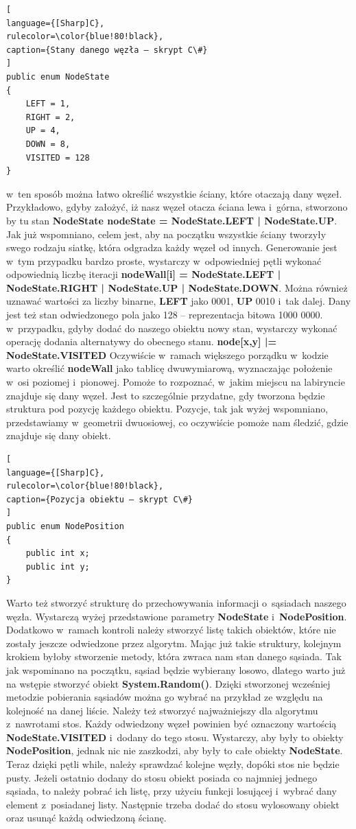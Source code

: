 \documentclass[oneside,polski,logo]{amuthesis}
\begin{document}
\begin{lstlisting}[
language={[Sharp]C},
rulecolor=\color{blue!80!black},
caption={Stany danego węzła – skrypt C\#}
]
public enum NodeState
{
    LEFT = 1,
    RIGHT = 2,
    UP = 4,
    DOWN = 8,
    VISITED = 128
}
\end{lstlisting}
w~ten sposób można łatwo określić wszystkie ściany, które otaczają dany węzeł. Przykładowo, gdyby założyć, iż nasz węzeł otacza ściana lewa i~górna, stworzono by tu stan \textbf{NodeState nodeState = NodeState.LEFT | NodeState.UP}. Jak już wspomniano, celem jest, aby na początku wszystkie ściany tworzyły swego rodzaju siatkę, która odgradza każdy węzeł od innych. Generowanie jest w~tym przypadku bardzo proste, wystarczy w~odpowiedniej pętli wykonać odpowiednią liczbę iteracji \textbf{nodeWall[i] = NodeState.LEFT | NodeState.RIGHT | NodeState.UP | NodeState.DOWN}. Można również uznawać wartości za liczby binarne, \textbf{LEFT} jako 0001, \textbf{UP} 0010 i~tak dalej. Dany jest też stan odwiedzonego pola jako 128 – reprezentacja bitowa 1000 0000. w~przypadku, gdyby dodać do naszego obiektu nowy stan, wystarczy wykonać operację dodania alternatywy do obecnego stanu. \textbf{node[x,y] |= NodeState.VISITED} Oczywiście w~ramach większego porządku w~kodzie warto określić \textbf{nodeWall} jako tablicę dwuwymiarową, wyznaczając położenie w~osi poziomej i~pionowej. Pomoże to rozpoznać, w~jakim miejscu na labiryncie znajduje się dany węzeł. Jest to szczególnie przydatne, gdy tworzona będzie struktura pod pozycję każdego obiektu. Pozycje, tak jak wyżej wspomniano, przedstawiamy w~geometrii dwuosiowej, co oczywiście pomoże nam śledzić, gdzie znajduje się dany obiekt. 

\begin{lstlisting}[
language={[Sharp]C},
rulecolor=\color{blue!80!black},
caption={Pozycja obiektu – skrypt C\#}
]
public enum NodePosition
{
	public int x;
	public int y;
}
\end{lstlisting}
Warto też stworzyć strukturę do przechowywania informacji o~sąsiadach naszego węzła. Wystarczą wyżej przedstawione parametry \textbf{NodeState} i~\textbf{NodePosition}. Dodatkowo w~ramach kontroli należy stworzyć listę takich obiektów, które nie zostały jeszcze odwiedzone przez algorytm. Mając już takie struktury, kolejnym krokiem byłoby stworzenie metody, która zwraca nam stan danego sąsiada. Tak jak wspominano na początku, sąsiad będzie wybierany losowo, dlatego warto już na wstępie stworzyć obiekt \textbf{System.Random()}. Dzięki stworzonej wcześniej metodzie pobierania sąsiadów można go wybrać na przykład ze względu na kolejność na danej liście. Należy też stworzyć najważniejszy dla algorytmu z~nawrotami stos. Każdy odwiedzony węzeł powinien być oznaczony wartością \textbf{NodeState.VISITED} i~dodany do tego stosu. Wystarczy, aby były to obiekty \textbf{NodePosition}, jednak nic nie zaszkodzi, aby były to całe obiekty \textbf{NodeState}. Teraz dzięki pętli while, należy sprawdzać kolejne węzły, dopóki stos nie będzie pusty. Jeżeli ostatnio dodany do stosu obiekt posiada co najmniej jednego sąsiada, to należy pobrać ich listę, przy użyciu funkcji losującej i~wybrać dany element z~posiadanej listy. Następnie trzeba dodać do stosu wylosowany obiekt oraz usunąć każdą odwiedzoną ścianę.
\end{document}
